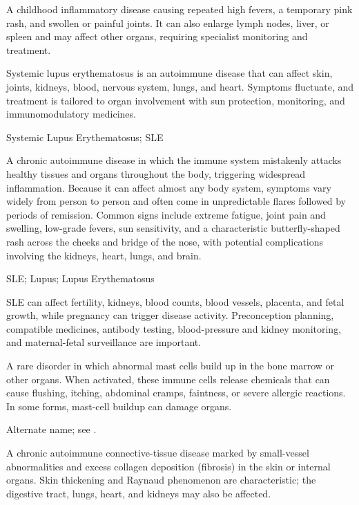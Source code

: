  A childhood inflammatory disease causing repeated high fevers, a temporary pink rash, and swollen or painful joints. It can also enlarge lymph nodes, liver, or spleen and may affect other organs, requiring specialist monitoring and treatment.

 Systemic lupus erythematosus is an autoimmune disease that can affect skin, joints, kidneys, blood, nervous system, lungs, and heart. Symptoms fluctuate, and treatment is tailored to organ involvement with sun protection, monitoring, and immunomodulatory medicines.

\synonyms
Systemic Lupus Erythematosus; SLE

 A chronic autoimmune disease in which the immune system mistakenly attacks healthy tissues and organs throughout the body, triggering widespread inflammation. Because it can affect almost any body system, symptoms vary widely from person to person and often come in unpredictable flares followed by periods of remission. Common signs include extreme fatigue, joint pain and swelling, low-grade fevers, sun sensitivity, and a characteristic butterfly-shaped rash across the cheeks and bridge of the nose, with potential complications involving the kidneys, heart, lungs, and brain.

\synonyms
SLE; Lupus; Lupus Erythematosus

 SLE can affect fertility, kidneys, blood counts, blood vessels, placenta, and fetal growth, while pregnancy can trigger disease activity. Preconception planning, compatible medicines, antibody testing, blood-pressure and kidney monitoring, and maternal-fetal surveillance are important.

 A rare disorder in which abnormal mast cells build up in the bone marrow or other organs. When activated, these immune cells release chemicals that can cause flushing, itching, abdominal cramps, faintness, or severe allergic reactions. In some forms, mast-cell buildup can damage organs.

 Alternate name; see .

 A chronic autoimmune connective-tissue disease marked by small-vessel abnormalities and excess collagen deposition (fibrosis) in the skin or internal organs. Skin thickening and Raynaud phenomenon are characteristic; the digestive tract, lungs, heart, and kidneys may also be affected.

